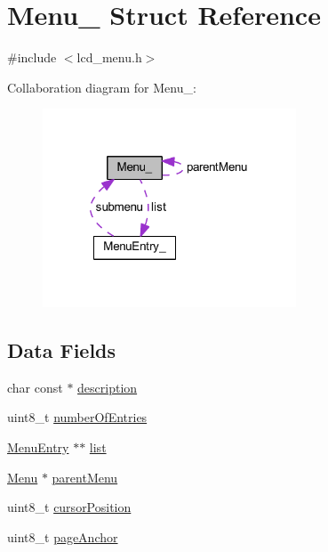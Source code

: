 \hypertarget{struct_menu__}{}\section{Menu\+\_\+ Struct Reference}
\label{struct_menu__}


{\ttfamily \#include $<$lcd\+\_\+menu.\+h$>$}



Collaboration diagram for Menu\+\_\+\+:\nopagebreak
\begin{figure}[H]
\begin{center}
\leavevmode
\includegraphics[width=214pt]{struct_menu____coll__graph}
\end{center}
\end{figure}
\subsection*{Data Fields}
\begin{DoxyCompactItemize}
\item 
char const  $\ast$ \mbox{\hyperlink{struct_menu___af92f126a07a2944ef81db37d6e6e21ae}{description}}
\item 
uint8\+\_\+t \mbox{\hyperlink{struct_menu___a4f106d3cb8ba7865c1972731deaf6d45}{number\+Of\+Entries}}
\item 
\mbox{\hyperlink{lcd__menu_8h_a5562b957d336dc1492f008e49dac5f5d}{Menu\+Entry}} $\ast$$\ast$ \mbox{\hyperlink{struct_menu___af3f1ad2de60356d88ae4151e60a87260}{list}}
\item 
\mbox{\hyperlink{lcd__menu_8h_afe0ab1c0311f677767b1588296b0f563}{Menu}} $\ast$ \mbox{\hyperlink{struct_menu___af153fe0e8d7a80232bc537bd3d99d14a}{parent\+Menu}}
\item 
uint8\+\_\+t \mbox{\hyperlink{struct_menu___a0d0cde5c12c27aa95e12e069cae5bdce}{cursor\+Position}}
\item 
uint8\+\_\+t \mbox{\hyperlink{struct_menu___ade32708e7d25a18c52ef9ea43022157e}{page\+Anchor}}
\end{DoxyCompactItemize}


